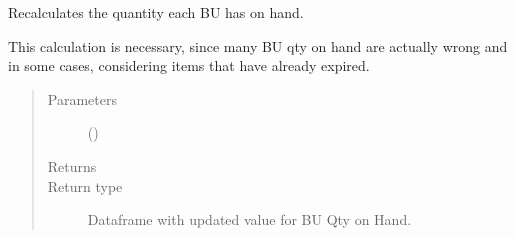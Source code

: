 \documentclass[letterpaper,10pt,english]{sphinxmanual}
\begin{document}
\begin{fulllineitems}
\label{\detokenize{source/optimization.datatools:optimization.datatools.dataprep.bu_qty_on_hand}}
Recalculates the quantity each BU has on hand.

This calculation is necessary, since many BU qty on hand are actually wrong
and in some cases, considering items that have already expired.
\begin{quote}\begin{description}
\item[{Parameters}] \leavevmode
{} () \textendash{} 

\item[{Returns}] \leavevmode
{}

\item[{Return type}] \leavevmode
Dataframe with updated value for BU Qty on Hand.

\end{description}\end{quote}

\end{fulllineitems}


\begin{fulllineitems}
\label{\detokenize{source/optimization.datatools:optimization.datatools.dataprep.change_dtype}}
\end{fulllineitems}

\end{document}
